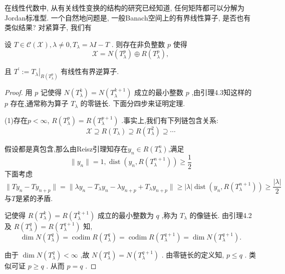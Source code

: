 \documentclass[lang=cn,newtx,10pt,scheme=chinese,thmcnt=chapter]{elegantbook}
\begin{document}
在线性代数中, 从有关线性变换的结构的研究已经知道, 任何矩阵都可以分解为Jordan标准型. 一个自然地问题是, 一般Banach空间上的有界线性算子, 是否也有类似结果? 对紧算子, 我们有
\begin{theorem}
    设 \(T \in  \mathcal{C}\left( \mathcal{X}\right) ,\lambda  \neq  0,{T}_{\lambda } = {\lambda I} - T\) . 则存在非负整数 \(p\) 使得
\begin{equation*}
\mathcal{X} = N\left( {T}_{\lambda }^{p}\right)  \oplus  R\left( {T}_{\lambda }^{p}\right) ,
\end{equation*}

且 \({T}^{\prime } \mathrel{\text{ := }} {\left. {T}_{\lambda }\right| }_{R\left( {T}_{\lambda }^{p}\right) }\) 有线性有界逆算子.

\end{theorem}
\begin{proof}
    用 \(p\) 记使得 \(N\left( {T}_{\lambda }^{k}\right)  = N\left( {T}_{\lambda }^{k + 1}\right)\) 成立的最小整数 \(p\) ,由引理4.3知这样的 \(p\) 存在,通常称为算子 \({T}_{\lambda }\) 的零链长. 下面分四步来证明定理.

(1)存在$p<\infty$, \(R\left( {T}_{\lambda }^{p}\right)  = R\left( {T}_{\lambda }^{p + 1}\right)\) .事实上,我们有下列链包含关系:
\begin{equation*}
\mathcal{X} \supseteq  R\left( {T}_{\lambda }\right)  \supseteq  R\left( {T}_{\lambda }^{2}\right)  \supseteq  \cdots
\end{equation*}

假设都是真包含,那么由Reisz引理知存在$y_n\in R(T_\lambda ^n)$,满足\[
\|y_n\|=1,\operatorname{dist}(y_n,R(T_\lambda^{n+1}))\geqslant \frac{1}{2}
\]
下面考虑
\[
\|Ty_n-Ty_{n+p}\|=\|\lambda y_n-T_\lambda y_n-\lambda y_{n+p}+T_\lambda y_{n+p}\|\geqslant |\lambda |\operatorname{dist}(y_n,R(T_\lambda^{n+1}))\geqslant \frac{|\lambda|}{2}
\]
与$T$是紧的矛盾.

 记使得 \(R\left( {T}_{\lambda }^{k}\right)  = R\left( {T}_{\lambda }^{k + 1}\right)\) 成立的最小整数为 \(q\) ,称为 \({T}_{\lambda }\) 的像链长. 由引理4.2 及 \(R\left( {T}_{\lambda }^{q}\right)  = R\left( {T}_{\lambda }^{q + 1}\right)\) 知,
\begin{equation*}
\dim N\left( {T}_{\lambda }^{q}\right)  = \operatorname{codim}R\left( {T}_{\lambda }^{q}\right)  = \operatorname{codim}R\left( {T}_{\lambda }^{q + 1}\right)  = \dim N\left( {T}_{\lambda }^{q + 1}\right) .
\end{equation*}

由于 \(\dim N\left( {T}_{\lambda }^{q}\right)  < \infty\) ,故 \(N\left( {T}_{\lambda }^{q}\right)  = N\left( {T}_{\lambda }^{q + 1}\right)\) . 由零链长的定义知, \(p \leqslant  q\) . 类似可证 \(p \geq  q\) . 从而 \(p = q\) .


\end{proof}
\end{document}
